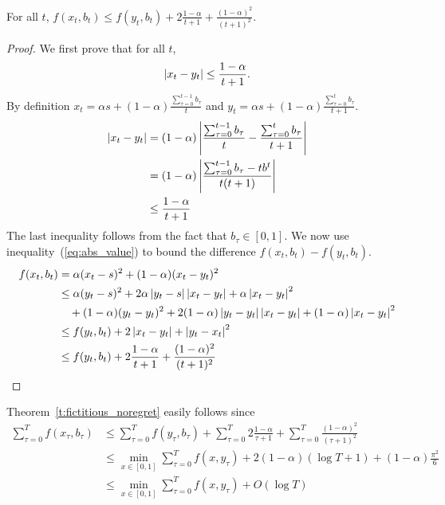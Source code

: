 \begin{lemma}
  For all $t$,
  \(f(x_t,b_t) \leq f(y_t,b_t) + 2\frac{1-\alpha}{t+1} + \frac{(1-\alpha)^2}{(t+1)^2}\).
\end{lemma}
\begin{proof}
  We first prove that for all $t$,
  \begin{equation}\label{eq:abs_value}
    \left|x_t - y_t \right| \leq \frac{1-\alpha}{t+1}.
  \end{equation}
  By definition
  \(x_t = \alpha s + (1-\alpha)\frac{\sum_{\tau = 0}^{t-1} b_\tau}{t}\)
  and
  \( y_t = \alpha s + (1-\alpha)\frac{\sum_{\tau = 0}^t b_\tau}{t+1}\).
  \begin{align*}
    \left|x_t - y_t\right|
    &=
    (1-\alpha)\left|\frac{\sum_{\tau = 0}^{t-1}b_\tau}{t}
    - \frac{\sum_{\tau = 0}^t b_\tau}{t+1}\right|\\
    &=
    (1-\alpha)\left|\frac{\sum_{\tau = 0}^{t-1}b_\tau -tb^t}{t(t+1)}\right|\\
    &\leq
    \frac{1-\alpha}{t+1}
  \end{align*}
  The last inequality follows from the fact that $b_\tau \in [0,1]$.
  We now use inequality~(\ref{eq:abs_value}) to bound the difference
  \( f(x_t,b_t) - f(y_t,b_t) \).
  \begin{align*}
    f(x_t,b_t)
    &=
    \alpha(x_t - s)^2 + (1 - \alpha)(x_t - y_t)^2 \\
    &\leq
    \alpha(y_t - s)^2 + 2\alpha\left|y_t -
    s\right|\left|x_t - y_t\right| + \alpha \left|x_t - y_t\right|^2 \\
    &\quad + (1-\alpha)(y_t - y_t)^2 +
    2(1-\alpha)\left|y_t - y_t\right|\left|x_t-y_t\right| + (1 - \alpha)\left|x_t - y_t\right|^2\\
    &\leq
    f(y_t,b_t) + 2\left|x_t - y_t\right| + \left|y_t - x_t\right|^2\\
    &\leq
    f(y_t,b_t) + 2\frac{1-\alpha}{t+1} + \frac{(1-\alpha)^2}{(t+1)^2}
  \end{align*}
\end{proof}

Theorem~\ref{t:fictitious_noregret} easily follows since
\begin{align*}
  \sum_{\tau=0}^T f(x_\tau,b_\tau)
  &\leq
  \sum_{\tau=0}^T f(y_\tau,b_\tau) + \sum_{\tau=0}^T 2\frac{1-\alpha}{\tau+1} +
  \sum_{\tau=0}^T \frac{(1-\alpha)^2}{(\tau+1)^2}\\
  &\leq
  \min_{ x \in [0,1]} \sum_{\tau=0}^T f(x,y_\tau) +
  2(1-\alpha)(\log T + 1) + (1-\alpha)\frac{\pi^2}{6}\\
  &\leq
  \min_{ x \in [0,1]} \sum_{\tau=0}^T f(x,y_\tau) + O(\log T)
\end{align*}
